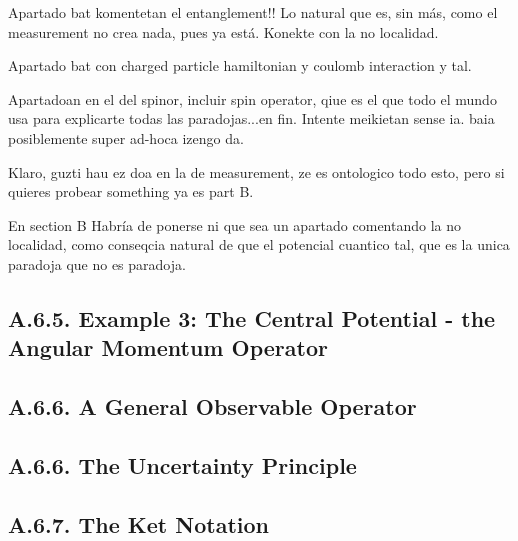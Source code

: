 \documentclass[11pt, a4paper]{article} %
\begin{document}
Apartado bat komentetan el entanglement!! Lo natural que es, sin más, como el measurement no crea nada, pues ya está. Konekte con la no localidad.

Apartado bat con charged particle hamiltonian y coulomb interaction y tal.

Apartadoan en el del spinor, incluir spin operator, qiue es el que todo el mundo usa para explicarte todas las paradojas...en fin. Intente meikietan sense ia. baia posiblemente super ad-hoca izengo da.

Klaro, guzti hau ez doa en la de measurement, ze es ontologico todo esto, pero si quieres probear something ya es part B.

En section B Habría de ponerse ni que sea un apartado comentando la no localidad, como conseqcia natural de que el potencial cuantico tal, que es la unica paradoja que no es paradoja.







\subsection*{A.6.5. Example 3: The Central Potential - the Angular Momentum Operator}


\subsection*{A.6.6. A General Observable Operator}

\subsection*{A.6.6. The Uncertainty Principle}
\subsection*{A.6.7. The Ket Notation}
\end{document}
